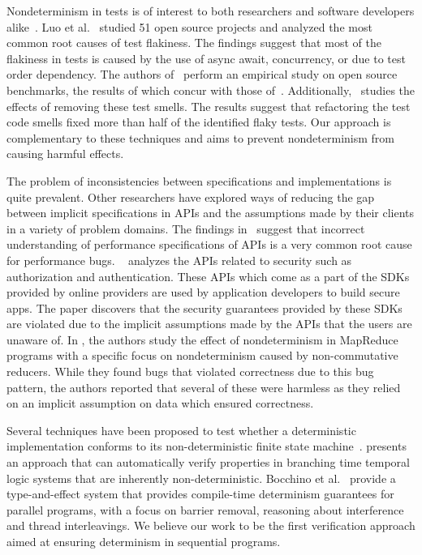 Nondeterminism in tests is of interest to both
researchers and software developers alike~\cite{Fowler,Sudarshan}.
Luo et al.~\cite{LuoHEM2014} studied 51 open source projects and analyzed the most common root causes of
test flakiness. The findings suggest that most of the flakiness in tests is caused by
the use of async await, concurrency, or due to test order dependency. The authors of~\cite{Plotkin:1993:LPP:645891.671433}
perform an empirical study on open source benchmarks, the results of which concur with those of~\cite{LuoHEM2014}.
Additionally,~\cite{Plotkin:1993:LPP:645891.671433} studies the effects of removing these test smells. The results suggest that
refactoring the test code smells fixed more than half of the identified flaky tests. Our approach is complementary to
these techniques and aims to prevent nondeterminism from causing harmful effects. 


The problem of inconsistencies between specifications and implementations
is quite prevalent. Other researchers have explored ways of reducing the gap between implicit
specifications in APIs and the assumptions made by their clients in a variety of problem domains.
The findings in~\cite{Jin:2012:UDR:2254064.2254075} suggest that incorrect understanding of performance specifications of 
APIs is a very common root cause for
performance bugs. ~\cite{Rui:2013:180377} analyzes the APIs related to security such as authorization and authentication.
These APIs which come as a part of the SDKs provided by online providers are used by application developers to 
build secure apps. The paper discovers that the security guarantees provided by these SDKs are violated due to
the implicit assumptions made by the APIs that the users are unaware of. In \cite{Xiao:2014:NMC:2591062.2591177},
the authors
study the effect of nondeterminism in MapReduce programs with a specific focus on nondeterminism caused by
non-commutative reducers. While they found bugs that violated correctness due to this bug pattern,
the authors reported that several of these were harmless as they relied on an implicit assumption on data
which ensured correctness. 

Several techniques have been proposed to test whether a
deterministic implementation conforms to its non-deterministic finite state machine~\cite{Petrenko1996,Petrenko:1993:NSM:648128.761244,Savor:1997:639710,Hierons:2004:TCD:1040993.1040998}.
\cite{Cook:2013:RNP:2491956.2491969} presents an approach that can automatically verify properties
in branching time temporal logic systems that are inherently
non-deterministic.
Bocchino et
al.~\cite{Bocchino:2009:TES:1640089.1640097,Bocchino:2011:SND:1926385.1926447}
provide a type-and-effect system that provides compile-time determinism
guarantees for parallel programs, with a focus on barrier removal,
reasoning about interference and thread interleavings.
We believe our work to be the first verification approach
aimed at ensuring determinism in sequential programs.

